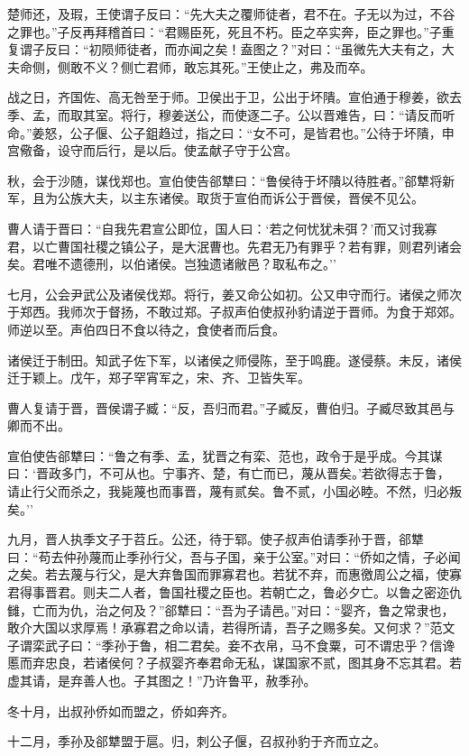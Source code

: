 \documentclass[]{article}
\begin{document}
楚师还，及瑕，王使谓子反曰：``先大夫之覆师徒者，君不在。子无以为过，不谷之罪也。''子反再拜稽首曰：``君赐臣死，死且不朽。臣之卒实奔，臣之罪也。''子重复谓子反曰：``初陨师徒者，而亦闻之矣！盍图之？''对曰：``虽微先大夫有之，大夫命侧，侧敢不义？侧亡君师，敢忘其死。''王使止之，弗及而卒。

战之日，齐国佐、高无咎至于师。卫侯出于卫，公出于坏隤。宣伯通于穆姜，欲去季、孟，而取其室。将行，穆姜送公，而使逐二子。公以晋难告，曰：``请反而听命。''姜怒，公子偃、公子鉏趋过，指之曰：``女不可，是皆君也。''公待于坏隤，申宫儆备，设守而后行，是以后。使孟献子守于公宫。

秋，会于沙随，谋伐郑也。宣伯使告郤犨曰：``鲁侯待于坏隤以待胜者。''郤犨将新军，且为公族大夫，以主东诸侯。取货于宣伯而诉公于晋侯，晋侯不见公。

曹人请于晋曰：``自我先君宣公即位，国人曰：`若之何忧犹未弭？'而又讨我寡君，以亡曹国社稷之镇公子，是大泯曹也。先君无乃有罪乎？若有罪，则君列诸会矣。君唯不遗德刑，以伯诸侯。岂独遗诸敝邑？取私布之。''

七月，公会尹武公及诸侯伐郑。将行，姜又命公如初。公又申守而行。诸侯之师次于郑西。我师次于督扬，不敢过郑。子叔声伯使叔孙豹请逆于晋师。为食于郑郊。师逆以至。声伯四日不食以待之，食使者而后食。

诸侯迁于制田。知武子佐下军，以诸侯之师侵陈，至于鸣鹿。遂侵蔡。未反，诸侯迁于颖上。戊午，郑子罕宵军之，宋、齐、卫皆失军。

曹人复请于晋，晋侯谓子臧：``反，吾归而君。''子臧反，曹伯归。子臧尽致其邑与卿而不出。

宣伯使告郤犨曰：``鲁之有季、孟，犹晋之有栾、范也，政令于是乎成。今其谋曰：`晋政多门，不可从也。宁事齐、楚，有亡而已，蔑从晋矣。'若欲得志于鲁，请止行父而杀之，我毙蔑也而事晋，蔑有贰矣。鲁不贰，小国必睦。不然，归必叛矣。''

九月，晋人执季文子于苕丘。公还，待于郓。使子叔声伯请季孙于晋，郤犨曰：``苟去仲孙蔑而止季孙行父，吾与子国，亲于公室。''对曰：``侨如之情，子必闻之矣。若去蔑与行父，是大弃鲁国而罪寡君也。若犹不弃，而惠徼周公之福，使寡君得事晋君。则夫二人者，鲁国社稷之臣也。若朝亡之，鲁必夕亡。以鲁之密迩仇雠，亡而为仇，治之何及？''郤犨曰：``吾为子请邑。''对曰：``婴齐，鲁之常隶也，敢介大国以求厚焉！承寡君之命以请，若得所请，吾子之赐多矣。又何求？''范文子谓栾武子曰：``季孙于鲁，相二君矣。妾不衣帛，马不食粟，可不谓忠乎？信谗慝而弃忠良，若诸侯何？子叔婴齐奉君命无私，谋国家不贰，图其身不忘其君。若虚其请，是弃善人也。子其图之！''乃许鲁平，赦季孙。

冬十月，出叔孙侨如而盟之，侨如奔齐。

十二月，季孙及郤犨盟于扈。归，刺公子偃，召叔孙豹于齐而立之。
\end{document}
